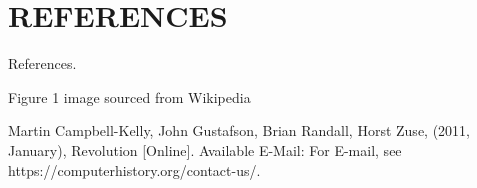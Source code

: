 \documentclass[letterpaper, 10 pt, conference]{IEEEconf}
\begin{document}
\section*{REFERENCES}
References.

\begin{enumerate}[label={[\arabic*]}]
\item Figure 1 image sourced from Wikipedia
\item Martin Campbell-Kelly, John Gustafson, 
Brian Randall, Horst Zuse, (2011, January),
Revolution [Online]. Available E-Mail:
For E-mail, see https://computerhistory.org/contact-us/.
\end{enumerate}
\end{document}
